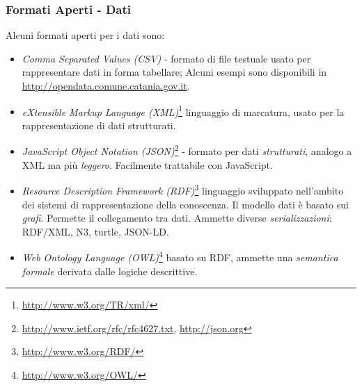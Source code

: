\documentclass[8pt]{beamer}
\begin{document}
\begin{frame}
\frametitle{Formati Aperti - Dati}
Alcuni formati aperti per i dati sono:
\vspace{\baselineskip}

\begin{itemize}[<+->]
 \item \emph{Comma Separated Values (CSV)} -  formato di file testuale usato per rappresentare
 dati in forma tabellare; Alcuni esempi sono disponibili in \url{http://opendata.comune.catania.gov.it}.
 
 \item \emph{eXtensible Markup Language (XML)}\footnote{\url{http://www.w3.org/TR/xml/}} linguaggio di marcatura, usato per la rappresentazione di dati strutturati.
 
 \item \emph{JavaScript Object Notation (JSON)}\footnote{\url{http://www.ietf.org/rfc/rfc4627.txt}, \url{http://json.org}} - formato per dati \emph{strutturati}, analogo a XML
 ma pi\`u \emph{leggero}. Facilmente trattabile con JavaScript.
 
 \item \emph{Resource Description Framework (RDF)}\footnote{\url{http://www.w3.org/RDF/}} linguaggio sviluppato nell'ambito dei sistemi di rappresentazione
 della conoscenza. Il modello dati \`e basato sui \emph{grafi}. Permette il collegamento tra dati. Ammette diverse \emph{serializzazioni}: RDF/XML, N3, turtle, JSON-LD.
 
 \item \emph{Web Ontology Language (OWL)}\footnote{\url{http://www.w3.org/OWL/}} basato su RDF, ammette una \emph{semantica formale}
 derivata dalle logiche descrittive.
\end{itemize}
\end{frame}
\end{document}
